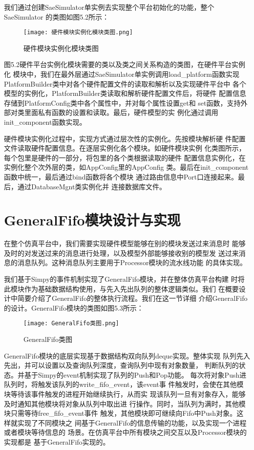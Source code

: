 我们通过创建SaeSimulator单实例去实现整个平台初始化的功能，整个SaeSimulator
的类图如图5.2所示：

\begin{figure}
    \centering
    \texttt{[image: 硬件模块实例化模块类图.png]}
    \caption{硬件模块实例化模块类图}
    \label{fig:badge}
\end{figure}

图5.2硬件平台实例化模块需要的类以及类之间关系构造的类图，在硬件平台实例化
模块中，我们在最外层通过SaeSimulator单实例调用load\_platform函数实现
PlatformBuilder类中对各个硬件配置文件的读取和解析以及实现硬件平台中
各个模型的实例化，PlatformBuilder类读取和解析硬件配置文件后，将硬件
配置信息存储到PlatformConfig类中各个属性中，并对每个属性设置get和
set函数，支持外部对类里面私有函数的设置和读取。最后，硬件模型的实
例化通过调用init\_component函数实现。

硬件模块实例化过程中，实现方式通过层次性的实例化。先按模块解析硬
件配置文件读取硬件配置信息。在逐层实例化各个模块。如硬件模块实例
化类图所示，每个包里是硬件的一部分，将包里的各个类根据读取的硬件
配置信息实例化，在实例化整个次外层的类，如AppConfig里的AppConfig
类。最后在init\_component函数中统一，最后通过bind函数将各个模块
通过路由信息中Port口连接起来。最后，通过DatabaseMgnt类实例化并
连接数据库文件。

\section{GeneralFifo模块设计与实现}

在整个仿真平台中，我们需要实现硬件模型能够在别的模块发送过来消息时
能够及时的对发送过来的消息进行处理，以及模型外部能够接收别的模型发
送过来消息的消息队列。这种消息队列主要用于Processor模块的流水线功能
的具体实现。

我们基于Simpy的事件机制实现了GeneralFifo模块，并在整体仿真平台构建
时将此模块作为基础数据结构使用，与先入先出队列的整体逻辑类似。我们
在概要设计中简要介绍了GeneralFifo的整体执行流程。我们在这一节详细
介绍GeneralFifo的设计。GeneralFifo模块的类图如图5.3所示：
\begin{figure}
    \centering
    \texttt{[image: GeneralFifo类图.png]}
    \caption{GeneralFifo类图}
    \label{fig:badge}
\end{figure}

GeneralFifo模块的底层实现基于数据结构双向队列deque实现。整体实现
队列先入先出，并可以设置以及查询队列深度，查询队列中现有对象数量，
判断队列的状态。并基于Simpy的event机制实现了队列的Push和Pop功能。
每次将对象Push进队列时，将触发该队列的write\_fifo\_event，该event事
件触发时，会使在其他模块等待该事件触发的进程开始继续执行，从而实
现该队列一旦有对象存入，能够及时通知其他模块将对象从队列中取出进
行操作。同时，当队列为满时，其他模块只需等待free\_fifo\_event事件
触发，其他模块即可继续向Fifo中Push对象。这样就实现了不同模块之
间基于GeneralFifo的信息传输的功能，以及实现一个进程或者模块等待信息的
场景。在仿真平台中所有模块之间交互以及Processor模块的实现都是
基于GeneralFifo实现的。

